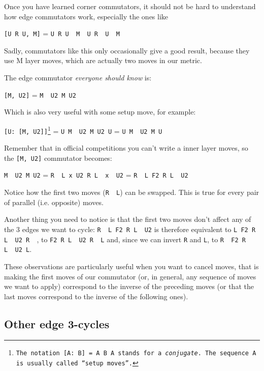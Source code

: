 \documentclass[11pt,a4paper]{book}
\newcommand{\p}{\textquotesingle}
\newcommand{\m}{\texttt}
\newcommand{\ps}{\p\,\,}
\begin{document}
Once you have learned corner commutators, it should not be hard to understand how edge commutators work, especially the ones like

\begin{center}
\m{[U R U\p, M\p]} = \m{U R U\ps M\ps U R\ps U\ps M}
\end{center}

Sadly, commutators like this only occasionally give a good result, because they use M layer moves, which are actually two moves in our metric.

The edge commutator \emph{everyone should know} is:

\begin{center}
\m{[M\p, U2]} = \m{M\ps U2 M U2}
\end{center}

Which is also very useful with some setup move, for example:

\begin{center}
\m{[U: [M\p, U2]]\footnote{The notation \m{[A: B]} = \m{A B A\p} stands for a \emph{conjugate}. The sequence \m A is usually called ``setup moves''.}} = \m{U M\ps U2 M U2 U\p} = \m{U M\ps U2 M U}
\end{center}

Remember that in official competitions you can't write a inner layer moves, so the \m{[M\p, U2]} commutator becomes:

\begin{center}
\m{M\ps U2 M U2} = \m{R\ps L x U2 R L\ps x\ps U2} = \m{R\ps L F2 R L\ps U2}
\end{center}

Notice how the first two moves (\m{R\ps L}) can be swapped. This is true for every pair of parallel (i.e. opposite) moves.

Another thing you need to notice is that the first two moves don't affect any of the 3 edges we want to cycle: \m{R\ps L F2 R L\ps U2} is therefore equivalent to \m{L F2 R L\ps U2 R\ps}, to \m{F2 R L\ps U2 R\ps L} and, since we can invert \m{R\p} and \m L, to \m{R\ps F2 R L\ps U2 L}.

These observations are particularly useful when you want to cancel moves, that is making the first moves of our commutator (or, in general, any sequence of moves we want to apply) correspond to the inverse of the preceding moves (or that the last moves correspond to the inverse of the following ones).

\subsection{Other edge 3-cycles}
\label{other-edge}
\end{document}
